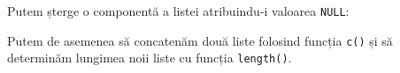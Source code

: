 \documentclass[]{article}
\newenvironment{Shaded}{\begin{snugshade}}{\end{snugshade}}
\newcommand{\DecValTok}[1]{\textcolor[rgb]{0.00,0.00,0.81}{#1}}
\newcommand{\StringTok}[1]{\textcolor[rgb]{0.31,0.60,0.02}{#1}}
\newcommand{\OtherTok}[1]{\textcolor[rgb]{0.56,0.35,0.01}{#1}}
\newcommand{\OperatorTok}[1]{\textcolor[rgb]{0.81,0.36,0.00}{\textbf{#1}}}
\newcommand{\NormalTok}[1]{#1}
\begin{document}
Putem șterge o componentă a listei atribuindu-i valoarea \texttt{NULL}:

\begin{Shaded}
\end{Shaded}

Putem de asemenea să concatenăm două liste folosind funcția \texttt{c()}
și să determinăm lungimea noii liste cu funcția \texttt{length()}.
\end{document}
